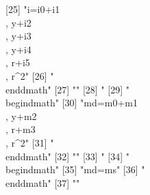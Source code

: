 [25] "{i}={i0}+{i1}\\, {y}+{i2}\\, {y}+{i3}\\, {y}+{i4}\\, {r}+{i5}\\, {r}^{2}"   
[26] "\\end{dmath}"                                                               
[27] ""                                                                           
[28] "%
[29] "\\begin{dmath}"                                                             
[30] "{md}={m0}+{m1}\\, {y}+{m2}\\, {r}+{m3}\\, {r}^{2}"                          
[31] "\\end{dmath}"                                                               
[32] ""                                                                           
[33] "%
[34] "\\begin{dmath}"                                                             
[35] "{md}={ms}"                                                                  
[36] "\\end{dmath}"                                                               
[37] ""                                                                           
